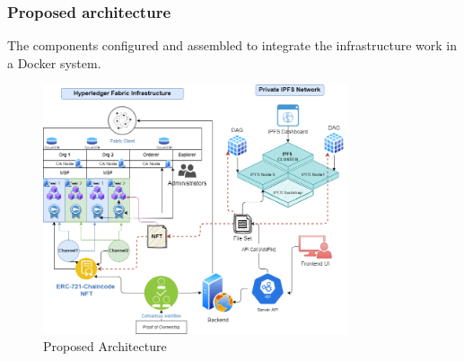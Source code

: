 \documentclass[a4paper]{article}
\begin{document}
\subsubsection{Proposed architecture}
The components configured and assembled to integrate the infrastructure work in a Docker system.

\begin{figure}[ht]
    \centering
    \includegraphics[width=9cm]{img/Hyperledger-NFT-Architecture.png}
    \caption{Proposed Architecture}
    \label{fig:SystemArch}
\end{figure}
\end{document}
